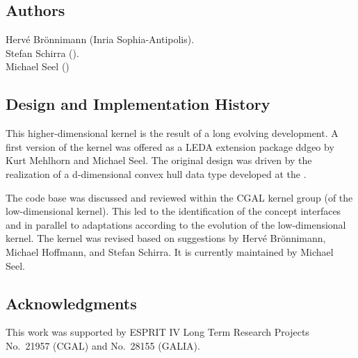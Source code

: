 \subsection*{Authors}

Herv\'e Br\"onnimann ({\sc Inria} Sophia-Antipolis). \\
Stefan Schirra ().\\
Michael Seel ()

\subsection*{Design and Implementation History}

This higher-dimensional kernel is the result of a long evolving
development. A first version of the kernel was offered as a LEDA
extension package ddgeo by Kurt Mehlhorn and Michael Seel. The
original design was driven by the realization of a d-dimensional
convex hull data type developed at the 
.

The code base was discussed and reviewed within the CGAL kernel group
(of the low-dimensional kernel).  This led to the identification of
the concept interfaces and in parallel to adaptations according to the
evolution of the low-dimensional kernel.  The kernel was revised
based on suggestions by Herv\'e Br\"onnimann, Michael Hoffmann, and
Stefan Schirra. It is currently maintained by Michael Seel.

\subsection*{Acknowledgments}

This work was supported by ESPRIT IV Long Term Research Projects
No.~21957 (CGAL) and No.~28155 (GALIA).


